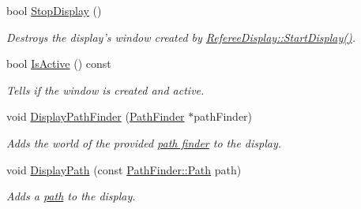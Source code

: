\begin{DoxyCompactItemize}
bool \hyperlink{classRefereeDisplay_aafa710132ce88c4e6cb4d430baf26173}{StopDisplay} ()
\begin{DoxyCompactList}\small\item\em Destroys the display's window created by \hyperlink{classRefereeDisplay_a6b789ef1ca73c72556cf5051a8a2b5a6}{RefereeDisplay::StartDisplay()}. \item\end{DoxyCompactList}\item 
bool \hyperlink{classRefereeDisplay_a216bbade42b7c7694f69d73c35620fc6}{IsActive} () const 
\begin{DoxyCompactList}\small\item\em Tells if the window is created and active. \item\end{DoxyCompactList}\item 
void \hyperlink{classRefereeDisplay_a0ef334a53e0fde02da30460ed2fcbe06}{DisplayPathFinder} (\hyperlink{classPathFinder}{PathFinder} $\ast$pathFinder)
\begin{DoxyCompactList}\small\item\em Adds the world of the provided \hyperlink{classPathFinder}{path finder} to the display. \item\end{DoxyCompactList}\item 
void \hyperlink{classRefereeDisplay_ad7f07077e92fd46956bf1aa25715e414}{DisplayPath} (const \hyperlink{classPathFinder_a269aba09b7b3208092f67f2bc02cf63e}{PathFinder::Path} path)
\begin{DoxyCompactList}\small\item\em Adds a \hyperlink{classPathFinder_a269aba09b7b3208092f67f2bc02cf63e}{path} to the display. \item\end{DoxyCompactList}\end{DoxyCompactItemize}
